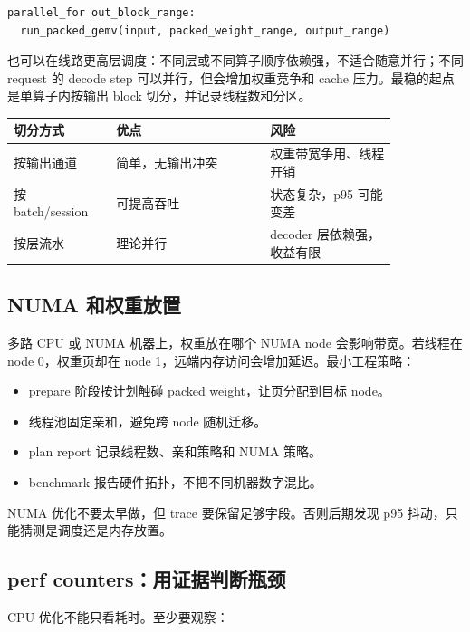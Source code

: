 \begin{lstlisting}[numbers=none,caption={按输出通道切分}]
parallel_for out_block_range:
  run_packed_gemv(input, packed_weight_range, output_range)
\end{lstlisting}

也可以在线路更高层调度：不同层或不同算子顺序依赖强，不适合随意并行；不同 request 的 decode step 可以并行，但会增加权重竞争和 cache 压力。最稳的起点是单算子内按输出 block 切分，并记录线程数和分区。

\begin{center}
\begin{tabular}{p{0.22\linewidth}p{0.34\linewidth}p{0.28\linewidth}}
\toprule
切分方式 & 优点 & 风险 \\
\midrule
按输出通道 & 简单，无输出冲突 & 权重带宽争用、线程开销 \\
按 batch/session & 可提高吞吐 & 状态复杂，p95 可能变差 \\
按层流水 & 理论并行 & decoder 层依赖强，收益有限 \\
\bottomrule
\end{tabular}
\end{center}

\subsection{NUMA 和权重放置}

多路 CPU 或 NUMA 机器上，权重放在哪个 NUMA node 会影响带宽。若线程在 node 0，权重页却在 node 1，远端内存访问会增加延迟。最小工程策略：

\begin{itemize}
  \item prepare 阶段按计划触碰 packed weight，让页分配到目标 node。
  \item 线程池固定亲和，避免跨 node 随机迁移。
  \item plan report 记录线程数、亲和策略和 NUMA 策略。
  \item benchmark 报告硬件拓扑，不把不同机器数字混比。
\end{itemize}

NUMA 优化不要太早做，但 trace 要保留足够字段。否则后期发现 p95 抖动，只能猜测是调度还是内存放置。

\subsection{perf counters：用证据判断瓶颈}

CPU 优化不能只看耗时。至少要观察：

